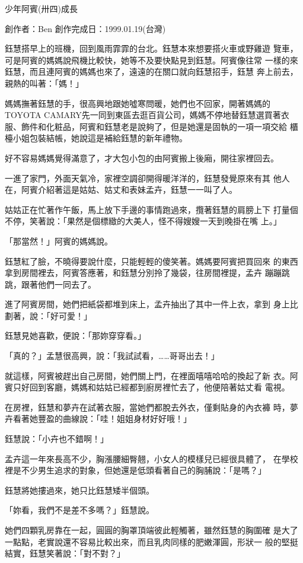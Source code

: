 



少年阿賓(卅四)成長

創作者：Ben
創作完成日：1999.01.19(台灣)


鈺慧搭早上的班機，回到風雨霏霏的台北。鈺慧本來想要搭火車或野雞遊
覽車，可是阿賓的媽媽說飛機比較快，她等不及要快點見到鈺慧。阿賓像往常
一樣的來鈺慧，而且連阿賓的媽媽也來了，遠遠的在關口就向鈺慧招手，鈺慧
奔上前去，親熱的叫著：「媽！」

媽媽撫著鈺慧的手，很高興地跟她噓寒問暖，她們也不回家，開著媽媽的
TOYOTA CAMARY先一同到東區去逛百貨公司，媽媽不停地替鈺慧選買著衣
服、飾件和化粧品，阿賓和鈺慧老是說夠了，但是她還是固執的一項一項交給
櫃檯小姐包裝結帳，她說這是補給鈺慧的新年禮物。

好不容易媽媽覺得滿意了，才大包小包的由阿賓搬上後廂，開往家裡回去。

一進了家門，外面天氣冷，家裡空調卻開得暖洋洋的，鈺慧發覺原來有其
他人在，阿賓介紹著這是姑姑、姑丈和表妹孟卉，鈺慧一一叫了人。

姑姑正在忙著作午飯，馬上放下手邊的事情跑過來，攬著鈺慧的肩膀上下
打量個不停，笑著說：「果然是個標緻的大美人，怪不得嫂嫂一天到晚掛在嘴
上。」

「那當然！」阿賓的媽媽說。

鈺慧紅了臉，不曉得要說什麼，只能輕輕的傻笑著。媽媽要阿賓把買回來
的東西拿到房間裡去，阿賓答應著，和鈺慧分別拎了幾袋，往房間裡提，孟卉
蹦蹦跳跳，跟著他們一同去了。

進了阿賓房間，她們把紙袋都堆到床上，孟卉抽出了其中一件上衣，拿到
身上比劃著，說：「好可愛！」

鈺慧見她喜歡，便說：「那妳穿穿看。」

「真的？」孟慧很高興，說：「我試試看，……哥哥出去！」

就這樣，阿賓被趕出自己房間，她們關上門，在裡面嘻嘻哈哈的換起了新
衣。阿賓只好回到客廳，媽媽和姑姑已經都到廚房裡忙去了，他便陪著姑丈看
電視。

在房裡，鈺慧和夢卉在試著衣服，當她們都脫去外衣，僅剩貼身的內衣褲
時，夢卉看著她豐盈的曲線說：「哇！姐姐身材好好哦！」

鈺慧說：「小卉也不錯啊！」

孟卉這一年來長高不少，胸漲腰細臀翹，小女人的模樣兒已經很具體了，
在學校裡是不少男生追求的對象，但她還是低頭看著自己的胸脯說：「是嗎？」

鈺慧將她摟過來，她只比鈺慧矮半個頭。

「妳看，我們不是差不多嗎？」鈺慧說。

她們四顆乳房靠在一起，圓圓的胸罩頂端彼此輕觸著，雖然鈺慧的胸圍確
是大了一點點，老實說還不容易比較出來，而且乳肉同樣的肥嫩渾圓，形狀一
般的堅挺結實，鈺慧笑著說：「對不對？」

